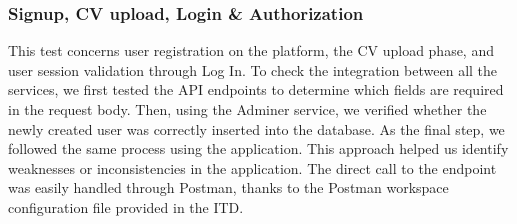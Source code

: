 \subsubsection{Signup, CV upload, Login \& Authorization}
This test concerns user registration on the platform, the CV upload phase, and user session validation through Log In. To check the integration between all the services, we first tested the API endpoints to determine which fields are required in the request body. Then, using the Adminer service, we verified whether the newly created user was correctly inserted into the database. As the final step, we followed the same process using the application. This approach helped us identify weaknesses or inconsistencies in the application. The direct call to the endpoint was easily handled through Postman, thanks to the Postman workspace configuration file provided in the ITD.

